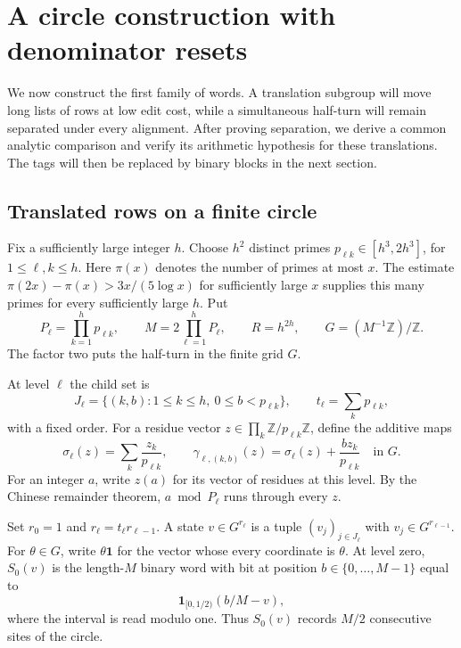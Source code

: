 \section{A circle construction with denominator resets}\label{sec:masks}

We now construct the first family of words. A translation subgroup will
move long lists of rows at low edit cost, while a simultaneous half-turn
will remain separated under every alignment. After proving separation, we derive a common analytic comparison and verify
its arithmetic hypothesis for these translations. The tags will then be
replaced by binary blocks in the next section.

\subsection{Translated rows on a finite circle}
Fix a sufficiently large integer $h$. Choose $h^2$ distinct primes
$p_{\ell k}\in[h^3,2h^3]$, for $1\leq\ell,k\leq h$. Here $\pi(x)$
denotes the number of primes at most $x$. The estimate
$\pi(2x)-\pi(x)>3x/(5\log x)$ for sufficiently large $x$
\cite[Corollary~3]{RosserSchoenfeld1962} supplies this many primes for every
sufficiently large $h$. Put
\begin{equation}\label{mask:parameters}
 P_\ell=\prod_{k=1}^h p_{\ell k},\qquad
 M=2\prod_{\ell=1}^hP_\ell,\qquad R=h^{2h},\qquad
 G=(M^{-1}\mathbb Z)/\mathbb Z.
\end{equation}
The factor two puts the half-turn in the finite grid $G$.

At level $\ell$ the child set is
\[
 J_\ell=\{(k,b):1\leq k\leq h,\ 0\leq b<p_{\ell k}\},
 \qquad t_\ell=\sum_kp_{\ell k},
\]
with a fixed order. For a residue vector
$z\in\prod_k\mathbb Z/p_{\ell k}\mathbb Z$, define the additive maps
\begin{equation}\label{mask:gamma}
 \sigma_\ell(z)=\sum_k\frac{z_k}{p_{\ell k}},\qquad
 \gamma_{\ell,(k,b)}(z)=\sigma_\ell(z)+\frac{bz_k}{p_{\ell k}}
 \quad\text{in }G.
\end{equation}
For an integer $a$, write $z(a)$ for its vector of residues at this level.
By the Chinese remainder theorem, $a\bmod P_\ell$ runs through every $z$.

Set $r_0=1$ and $r_\ell=t_\ell r_{\ell-1}$. A state
$v\in G^{r_\ell}$ is a tuple $(v_j)_{j\in J_\ell}$ with
$v_j\in G^{r_{\ell-1}}$. For $\theta\in G$, write $\theta\mathbf1$ for the
vector whose every coordinate is $\theta$. At level zero, $S_0(v)$ is the length-$M$ binary word with
bit at position $b\in\{0,\ldots,M-1\}$ equal to
\[
 \mathbf1_{[0,1/2)}(b/M-v),
\]
where the interval is read modulo one. Thus $S_0(v)$ records $M/2$
consecutive sites of the circle.


